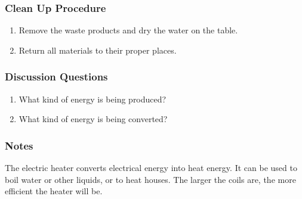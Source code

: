 \subsubsection*{Clean Up Procedure}
\begin{enumerate}
\item{Remove the waste products and dry the water on the table.} 
\item{Return all materials to their proper places.} 
\end{enumerate}

\subsubsection*{Discussion Questions}
\begin{enumerate}
\item{What kind of energy is being produced?}
\item{What kind of energy is being converted?}
\end{enumerate}

\subsubsection*{Notes}
The electric heater converts electrical energy into heat energy. It can be used to boil water or other liquids, or to heat houses. The larger the coils are, the more efficient the heater will be.  




